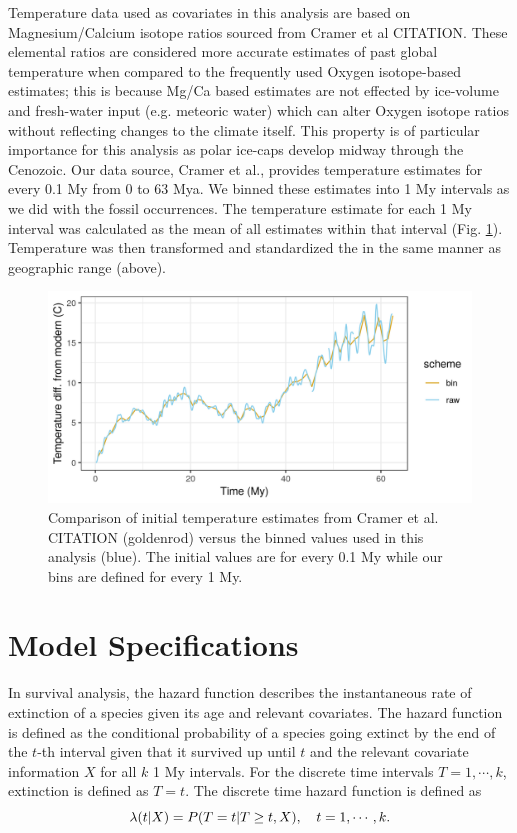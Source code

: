 \documentclass[12pt,letterpaper]{article}
\begin{document}
Temperature data used as covariates in this analysis are based on Magnesium/Calcium isotope ratios sourced from Cramer et al CITATION. These elemental ratios are considered more accurate estimates of past global temperature when compared to the frequently used Oxygen isotope-based estimates; this is because Mg/Ca based estimates are not effected by ice-volume and fresh-water input (e.g. meteoric water) which can alter Oxygen isotope ratios without reflecting changes to the climate itself. This property is of particular importance for this analysis as polar ice-caps develop midway through the Cenozoic. Our data source, Cramer et al., provides temperature estimates for every 0.1 My from 0 to 63 Mya. We binned these estimates into 1 My intervals as we did with the fossil occurrences. The temperature estimate for each 1 My interval was calculated as the mean of all estimates within that interval (Fig. \ref{fig:temp_curve}). Temperature was then transformed and standardized the in the same manner as geographic range (above).

\begin{figure}[ht]
  \centering
  \includegraphics[width=\textwidth,height=0.5\textheight,keepaspectratio=true]{../results/figure/cramer_temp}
  \caption{Comparison of initial temperature estimates from Cramer et al. CITATION (goldenrod) versus the binned values used in this analysis (blue). The initial values are for every 0.1 My while our bins are defined for every 1 My.}
  \label{fig:temp_curve}
\end{figure}


\section{Model Specifications}

In survival analysis, the hazard function describes the instantaneous rate of extinction of a species given its age and relevant covariates. The hazard function is defined as the conditional probability of a species going extinct by the end of the \(t\)-th interval given that it survived up until \(t\) and the relevant covariate information \(X\) for all \(k\) 1 My intervals. For the discrete time intervals \(T = 1, \cdots, k\), extinction is defined as \(T = t\). The discrete time hazard function is defined as
\begin{equation}
  \lambda(t | X) = P(T = t | T \geq t, X), \quad t = 1, \cdots, k. \\
  \label{eq:hazard}
\end{equation}
\end{document}

